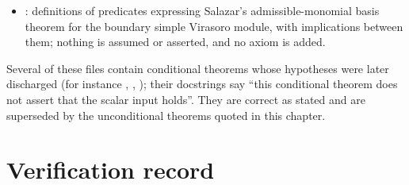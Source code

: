 \begin{itemize}
  Benoit--Saint-Aubin $(1,N)$ singular vectors, in the vacuum module and in general Verma modules
  (: a nonzero highest-weight vector at level $N$ of $M(c(t),h_{1,N}(t))$ for every
  $t\ne0$, $N>0$). , , ,
  , , ,
  , : the fusion construction of
  singular vectors and its arithmetic (nonresonance at prime-power labels; uniqueness of the primitive label of a
  charge). , : the translated first-order
  form, giving the Verma-to-vacuum coefficient identity of step (d).
\item {}: definitions of predicates expressing Salazar's admissible-monomial basis
  theorem for the boundary simple Virasoro module, with implications between them; nothing is assumed or asserted,
  and no axiom is added.
\end{itemize}
Several of these files contain conditional theorems whose hypotheses were later discharged (for instance
, ,
); their docstrings say ``this conditional theorem does not assert that the
scalar input holds''. They are correct as stated and are superseded by the unconditional theorems quoted in this
chapter.

\section{Verification record}\label{l07:sec:axioms}

